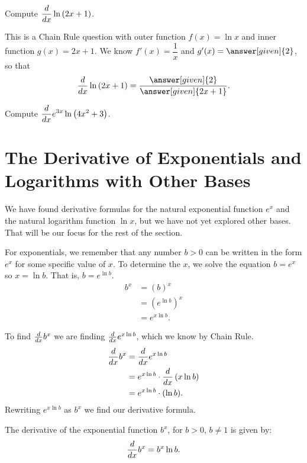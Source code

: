 \documentclass{ximera}
\begin{document}
\begin{example}
	Compute $\displaystyle \frac{d}{\mathop{}\!d x} \ln\left(2x+1\right)$.

	\begin{explanation}
		This is a Chain Rule question with outer function $f(x) = \ln x$ and inner function $g(x) = 2x+1$.
		We know $f'(x) = \dfrac{1}{x}$ and $g'(x) = \answer[given]{2}$, so that
		\[ \ddx \ln\left( 2x+1\right) = \dfrac{\answer[given]{2}}{\answer[given]{2x+1}}. \]
	\end{explanation}
\end{example}

\begin{question}
	Compute $\displaystyle \frac{d}{\mathop{}\!d x} e^{3x} \ln\left( 4x^2+3\right)$.
	  \begin{multipleChoice}
	\end{multipleChoice}
\end{question}

\section{The Derivative of Exponentials and Logarithms with Other Bases}
We have found derivative formulas for the natural exponential function $e^x$ and the natural logarithm function $\ln x$, but we have not
yet explored other bases.  That will be our focus for the rest of the section. 

For exponentials, we remember that any number $b > 0$ can be written in the form $e^x$ for some specific value of $x$.  To determine the $x$,
we solve the equation $b = e^x$ so $x = \ln b$.  That is, $b = e^{\ln b}$.  
\begin{align*}
	b^x &= (b)^x\\
		&= \left( e^{\ln b} \right)^x\\
		&= e^{x \ln b}.
\end{align*}

To find $\frac{d}{\mathop{}\!d x} b^x$ we are finding $\frac{d}{\mathop{}\!d x} e^{x \ln b}$, which we know by Chain Rule.
\begin{align*} 
	\frac{d}{\mathop{}\!d x} b^x &= \frac{d}{\mathop{}\!d x} e^{x \ln b}\\
		&= e^{x \ln b} \cdot \frac{d}{\mathop{}\!d x} \left( x \ln b \right)\\ 
		&= e^{x \ln b} \cdot (\ln b).
\end{align*}
Rewriting $e^{x \ln b}$ as $b^x$ we find our derivative formula.
\begin{theorem}
	The derivative of the exponential function $b^x$, for $b > 0$, $b \neq 1$ is given by:
	\[ \frac{d}{\mathop{}\!d x} b^x = b^x \ln b. \]
\end{theorem}
\end{document}

